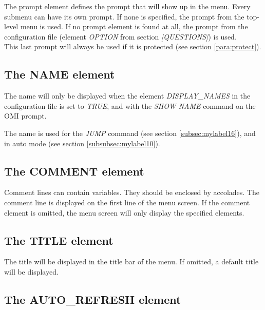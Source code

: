 \documentclass[a4paper]{book}
\newcommand{\vs}{\vspace{3mm}}
\begin{document}
The prompt element defines the prompt that 
will show up in the menu. Every submenu can have its own prompt. If none is 
specified, the prompt from the top-level menu is used. If no prompt element 
is found at all, the prompt from the configuration file (element \textsl{OPTION} from 
section \textsl{[QUESTIONS]}) is used. \\
This last prompt will always be used if it is protected (see section \ref{para:protect}).

\subsection{The NAME element}
\label{subsubsec:mylabel24}

The name will only be displayed when the element \textsl{DISPLAY{\_}NAMES} in the 
configuration file is set to \textsl{TRUE}, and with the \textsl{SHOW NAME} command on the OMI prompt.

\vs

The name is used for the \textsl{JUMP} command (see section \ref{subsec:mylabel16}),
and in auto mode (see section \ref{subsubsec:mylabel10}).

\subsection{The COMMENT element}
\label{subsubsec:mylabel25}

Comment lines can contain variables. They should be enclosed by accolades. 
The comment line is displayed on the first line of the menu screen. If the 
comment element is omitted, the menu screen will only display the specified 
elements.

\subsection{The TITLE element}
\label{subsubsec:mylabel26}

The title will be displayed in the title bar of the menu. If omitted, a 
default title will be displayed.

\subsection{The AUTO{\_}REFRESH element}
\label{subsubsec:mylabel27}
\end{document}
